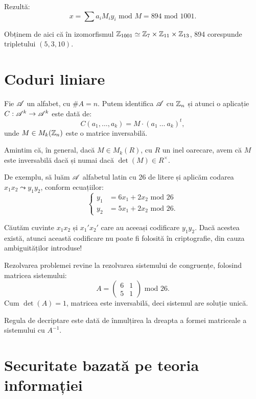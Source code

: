 Rezultă:
\[
  x = \sum a_i M_i y_i \text{ mod } M = 894 \text{ mod } 1001.
\]

Obținem de aici că în izomorfismul $ \mathbb{Z}_{1001} \simeq \mathbb{Z}_7 \times \mathbb{Z}_{11} \times \mathbb{Z}_{13} $,
894 corespunde tripletului $(5, 3, 10) $.


\section{Coduri liniare}

Fie $ \mathscr{A} $ un alfabet, cu $ \# A = n $. Putem identifica $ \mathscr{A} $ cu $ \mathbb{Z}_n $
și atunci o aplicație $ C : \mathscr{A}^k \to \mathscr{A}^k $ este dată de:
\[
  C(a_1, \dots, a_k) = M \cdot (a_1 \ \dots \ a_k)^t,
\]
unde $ M \in M_k(\mathbb{Z}_n) $ este o matrice inversabilă.

Amintim că, în general, dacă $ M \in M_k(R) $, cu $ R $ un inel oarecare,
avem că $ M $ este inversabilă dacă și numai dacă $ \det(M) \in R^\times $.

De exemplu, să luăm $ \mathscr{A} $ alfabetul latin cu 26 de litere și
aplicăm codarea $ x_1 x_2 \leadsto y_1 y_2 $, conform ecuațiilor:
\[
  \begin{cases}
    y_1 &= 6x_1 + 2x_2 \text{ mod } 26 \\
    y_2 &= 5x_1 + 2x_2 \text{ mod } 26.
  \end{cases}
\]

Căutăm cuvinte $ x_1 x_2 $ și $ x_1'x_2' $ care au aceeași codificare
$ y_1 y_2 $. Dacă acestea există, atunci această codificare nu poate
fi folosită în criptografie, din cauza ambiguităților introduse!

Rezolvarea problemei revine la rezolvarea sistemului de congruențe,
folosind matricea sistemului:
\[
  A = %
  \begin{pmatrix}
    6 & 1 \\
    5 & 1
  \end{pmatrix} \text{ mod } 26.
\]
Cum $ \det(A) = 1 $, matricea este inversabilă, deci sistemul are soluție unică.

Regula de decriptare este dată de înmulțirea la dreapta a formei matriceale
a sistemului cu $ A^{-1} $.


\section{Securitate bazată pe teoria informației}

